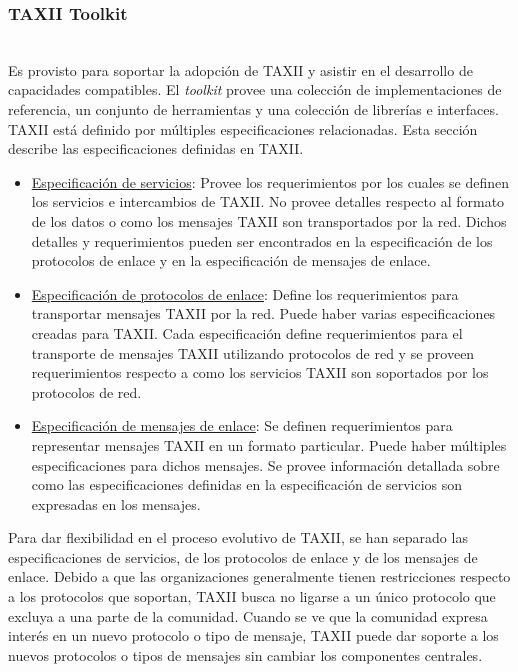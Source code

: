 \subsubsection{TAXII Toolkit}\ \\

Es provisto para soportar la adopción de TAXII y asistir en el desarrollo de 
capacidades compatibles. El \textit{toolkit} provee una colección de implementaciones de 
referencia, un conjunto de herramientas y una colección de librerías e 
interfaces.\\

TAXII está definido por múltiples especificaciones relacionadas. Esta sección 
describe las especificaciones definidas en TAXII.

\begin{itemize}
  \item \underline{Especificación de servicios}: Provee los requerimientos por los cuales se 
  definen los servicios e intercambios de TAXII. No provee detalles respecto al 
  formato de los datos o como los mensajes TAXII son transportados por la red. 
  Dichos detalles y requerimientos pueden ser encontrados en la especificación 
  de los protocolos de enlace y en la especificación de mensajes de enlace.
 \item \underline{Especificación de protocolos de enlace}: Define los requerimientos para 
 transportar mensajes TAXII por la red. Puede haber varias especificaciones 
 creadas para TAXII. Cada especificación define requerimientos para el 
 transporte de mensajes TAXII utilizando protocolos de red y se proveen 
 requerimientos respecto a como los servicios TAXII son soportados por los 
 protocolos de red.
 \item \underline{Especificación de mensajes de enlace}: Se definen requerimientos para 
 representar mensajes TAXII en un formato particular. Puede haber múltiples 
 especificaciones para dichos mensajes. Se provee información detallada sobre 
 como las especificaciones definidas en la especificación de servicios son 
 expresadas en los mensajes.
\end{itemize}

Para dar flexibilidad en el proceso evolutivo de TAXII, se han separado las 
especificaciones de servicios, de los protocolos de enlace y de los mensajes de 
enlace.
Debido a que las organizaciones generalmente tienen restricciones 
respecto a los protocolos que soportan, TAXII busca no ligarse a un único 
protocolo que excluya a una parte de la comunidad. Cuando se ve que la comunidad 
expresa interés en un nuevo protocolo o tipo de mensaje, TAXII puede dar soporte 
a los nuevos protocolos o tipos de mensajes sin cambiar los componentes centrales.\\

